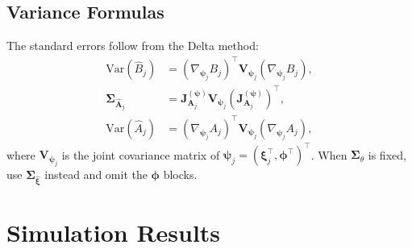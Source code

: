 \documentclass[man, 12pt, floatsintext]{apa7}
\begin{document}
\subsection{Variance Formulas}

The standard errors follow from the Delta method:
\begin{align*}
\text{Var}(\hat{B}_j) &= (\nabla_{\boldsymbol{\psi}_j} B_j)^\top \mathbf{V}_{\boldsymbol{\psi}_j} (\nabla_{\boldsymbol{\psi}_j} B_j), \\
\boldsymbol{\Sigma}_{\hat{\mathbf{A}}_j} &= \mathbf{J}_{\mathbf{A}_j}^{(\boldsymbol{\psi})} \mathbf{V}_{\boldsymbol{\psi}_j} (\mathbf{J}_{\mathbf{A}_j}^{(\boldsymbol{\psi})})^\top, \\
\text{Var}(\hat{A}_j) &= (\nabla_{\boldsymbol{\psi}_j} A_j)^\top \mathbf{V}_{\boldsymbol{\psi}_j} (\nabla_{\boldsymbol{\psi}_j} A_j),
\end{align*}
where $\mathbf{V}_{\boldsymbol{\psi}_j}$ is the joint covariance matrix of $\boldsymbol{\psi}_j = (\boldsymbol{\xi}_j^\top, \boldsymbol{\phi}^\top)^\top$. When $\boldsymbol{\Sigma}_\theta$ is fixed, use $\mathbf{\Sigma}_{\hat{\boldsymbol{\xi}}}$ instead and omit the $\boldsymbol{\phi}$ blocks.

\section{Simulation Results}

\end{document}
